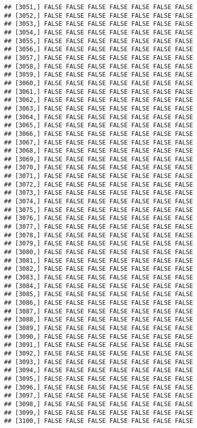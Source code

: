 \documentclass[
]{article}
\begin{document}
\begin{verbatim}
## [3051,] FALSE FALSE FALSE FALSE FALSE FALSE FALSE
## [3052,] FALSE FALSE FALSE FALSE FALSE FALSE FALSE
## [3053,] FALSE FALSE FALSE FALSE FALSE FALSE FALSE
## [3054,] FALSE FALSE FALSE FALSE FALSE FALSE FALSE
## [3055,] FALSE FALSE FALSE FALSE FALSE FALSE FALSE
## [3056,] FALSE FALSE FALSE FALSE FALSE FALSE FALSE
## [3057,] FALSE FALSE FALSE FALSE FALSE FALSE FALSE
## [3058,] FALSE FALSE FALSE FALSE FALSE FALSE FALSE
## [3059,] FALSE FALSE FALSE FALSE FALSE FALSE FALSE
## [3060,] FALSE FALSE FALSE FALSE FALSE FALSE FALSE
## [3061,] FALSE FALSE FALSE FALSE FALSE FALSE FALSE
## [3062,] FALSE FALSE FALSE FALSE FALSE FALSE FALSE
## [3063,] FALSE FALSE FALSE FALSE FALSE FALSE FALSE
## [3064,] FALSE FALSE FALSE FALSE FALSE FALSE FALSE
## [3065,] FALSE FALSE FALSE FALSE FALSE FALSE FALSE
## [3066,] FALSE FALSE FALSE FALSE FALSE FALSE FALSE
## [3067,] FALSE FALSE FALSE FALSE FALSE FALSE FALSE
## [3068,] FALSE FALSE FALSE FALSE FALSE FALSE FALSE
## [3069,] FALSE FALSE FALSE FALSE FALSE FALSE FALSE
## [3070,] FALSE FALSE FALSE FALSE FALSE FALSE FALSE
## [3071,] FALSE FALSE FALSE FALSE FALSE FALSE FALSE
## [3072,] FALSE FALSE FALSE FALSE FALSE FALSE FALSE
## [3073,] FALSE FALSE FALSE FALSE FALSE FALSE FALSE
## [3074,] FALSE FALSE FALSE FALSE FALSE FALSE FALSE
## [3075,] FALSE FALSE FALSE FALSE FALSE FALSE FALSE
## [3076,] FALSE FALSE FALSE FALSE FALSE FALSE FALSE
## [3077,] FALSE FALSE FALSE FALSE FALSE FALSE FALSE
## [3078,] FALSE FALSE FALSE FALSE FALSE FALSE FALSE
## [3079,] FALSE FALSE FALSE FALSE FALSE FALSE FALSE
## [3080,] FALSE FALSE FALSE FALSE FALSE FALSE FALSE
## [3081,] FALSE FALSE FALSE FALSE FALSE FALSE FALSE
## [3082,] FALSE FALSE FALSE FALSE FALSE FALSE FALSE
## [3083,] FALSE FALSE FALSE FALSE FALSE FALSE FALSE
## [3084,] FALSE FALSE FALSE FALSE FALSE FALSE FALSE
## [3085,] FALSE FALSE FALSE FALSE FALSE FALSE FALSE
## [3086,] FALSE FALSE FALSE FALSE FALSE FALSE FALSE
## [3087,] FALSE FALSE FALSE FALSE FALSE FALSE FALSE
## [3088,] FALSE FALSE FALSE FALSE FALSE FALSE FALSE
## [3089,] FALSE FALSE FALSE FALSE FALSE FALSE FALSE
## [3090,] FALSE FALSE FALSE FALSE FALSE FALSE FALSE
## [3091,] FALSE FALSE FALSE FALSE FALSE FALSE FALSE
## [3092,] FALSE FALSE FALSE FALSE FALSE FALSE FALSE
## [3093,] FALSE FALSE FALSE FALSE FALSE FALSE FALSE
## [3094,] FALSE FALSE FALSE FALSE FALSE FALSE FALSE
## [3095,] FALSE FALSE FALSE FALSE FALSE FALSE FALSE
## [3096,] FALSE FALSE FALSE FALSE FALSE FALSE FALSE
## [3097,] FALSE FALSE FALSE FALSE FALSE FALSE FALSE
## [3098,] FALSE FALSE FALSE FALSE FALSE FALSE FALSE
## [3099,] FALSE FALSE FALSE FALSE FALSE FALSE FALSE
## [3100,] FALSE FALSE FALSE FALSE FALSE FALSE FALSE

\end{verbatim}
\end{document}
